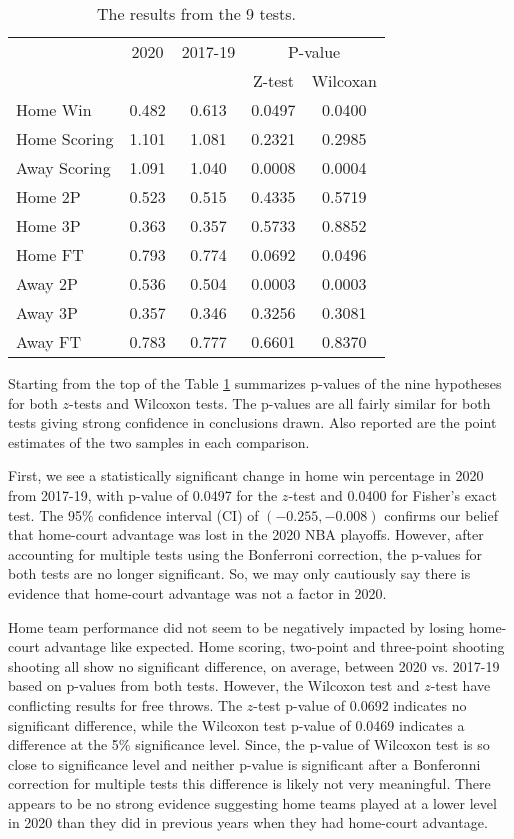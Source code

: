 \documentclass[12pt, letterpaper, titlepage]{article}
\begin{document}
\begin{table}
  \caption{The results from the 9 tests.}
  \label{tab:table}
\centering
\begin{tabular}[t]{lcccc}
  \toprule
  & 2020 & 2017-19 & \multicolumn{2}{c}{P-value}\\
  \cmidrule(lr){4-5}
  &          &                & Z-test & Wilcoxan\\
\midrule
Home Win & 0.482 & 0.613 & 0.0497 & 0.0400\\
Home Scoring & 1.101 & 1.081 & 0.2321 & 0.2985\\
Away Scoring & 1.091 & 1.040 & 0.0008 & 0.0004\\
Home 2P & 0.523 & 0.515 & 0.4335 & 0.5719\\
Home 3P & 0.363 & 0.357 & 0.5733 & 0.8852\\
Home FT & 0.793 & 0.774 & 0.0692 & 0.0496\\
Away 2P & 0.536 & 0.504 & 0.0003 & 0.0003\\
Away 3P & 0.357 & 0.346 & 0.3256 & 0.3081\\
Away FT & 0.783 & 0.777 & 0.6601 & 0.8370\\
\bottomrule
\end{tabular}
\end{table}

Starting from the top of the
Table \ref{tab:table} summarizes p-values of the nine hypotheses for both
\(z\)-tests and Wilcoxon tests. The p-values are all fairly similar for both
tests giving strong confidence in conclusions drawn. Also reported are
the point estimates of the two samples in each comparison.

First, we see a statistically significant change
in home win percentage in 2020 from 2017-19, with p-value of 0.0497 for the
\(z\)-test and 0.0400 for Fisher's exact test. The 95\% confidence
interval (CI) of \((-0.255, -0.008)\)
confirms our belief that home-court advantage was lost in the 2020 NBA playoffs. However, after accounting for
multiple tests using the Bonferroni correction, the p-values for both tests are no longer significant.
So, we may only cautiously say there is evidence that home-court advantage was
not a factor in 2020.

Home team performance did not seem to be negatively impacted by losing home-court
advantage like expected. Home scoring, two-point and three-point shooting
shooting all show no significant difference, on average, between 2020 vs.
2017-19 based on p-values from both tests. However, the Wilcoxon test and \(z\)-test have conflicting results
for free throws. The \(z\)-test p-value of 0.0692 indicates no significant difference, while
the Wilcoxon test p-value of 0.0469 indicates a difference at the 5\% significance level. Since,
the p-value of Wilcoxon test is so close to significance level and neither p-value is significant
after a Bonferonni correction for multiple tests this difference is likely not very meaningful.
There appears to be no strong evidence suggesting home teams played at
a lower level in 2020 than they did in previous years when they had home-court advantage.
\end{document}
